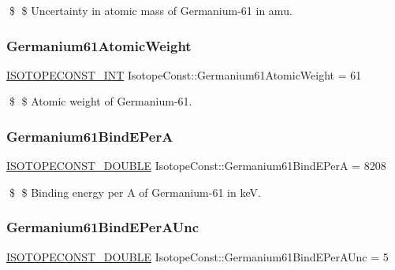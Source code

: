 \$ \$ Uncertainty in atomic mass of Germanium-\/61 in amu. \mbox{\label{group___isotope_const-_germanium-_ge61_ga622e2588761f89d25997b1a4618077ba}} 
\subsubsection{\texorpdfstring{Germanium61\+Atomic\+Weight}{Germanium61AtomicWeight}}
{\footnotesize\ttfamily \mbox{\hyperlink{group___isotope_const-_macros_ga5f18360b3e99483a35c32d789e62621c}{I\+S\+O\+T\+O\+P\+E\+C\+O\+N\+S\+T\+\_\+\+I\+NT}} Isotope\+Const\+::\+Germanium61\+Atomic\+Weight = 61}

\$ \$ Atomic weight of Germanium-\/61. \mbox{\label{group___isotope_const-_germanium-_ge61_ga9b183a62abf8bb22e4877abe6d3446ff}} 
\subsubsection{\texorpdfstring{Germanium61\+Bind\+E\+PerA}{Germanium61BindEPerA}}
{\footnotesize\ttfamily \mbox{\hyperlink{group___isotope_const-_macros_ga8f45a7272ce02c0b4c65c44636ed719a}{I\+S\+O\+T\+O\+P\+E\+C\+O\+N\+S\+T\+\_\+\+D\+O\+U\+B\+LE}} Isotope\+Const\+::\+Germanium61\+Bind\+E\+PerA = 8208}

\$ \$ Binding energy per A of Germanium-\/61 in keV. \mbox{\label{group___isotope_const-_germanium-_ge61_gaf08550de0b9d98f445ead4303e14f724}} 
\subsubsection{\texorpdfstring{Germanium61\+Bind\+E\+Per\+A\+Unc}{Germanium61BindEPerAUnc}}
{\footnotesize\ttfamily \mbox{\hyperlink{group___isotope_const-_macros_ga8f45a7272ce02c0b4c65c44636ed719a}{I\+S\+O\+T\+O\+P\+E\+C\+O\+N\+S\+T\+\_\+\+D\+O\+U\+B\+LE}} Isotope\+Const\+::\+Germanium61\+Bind\+E\+Per\+A\+Unc = 5}

